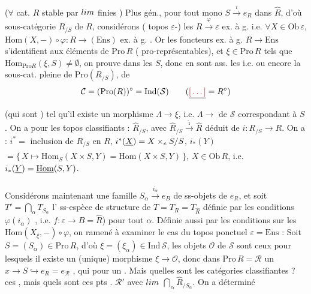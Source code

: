 \documentclass[11pt,a4paper]{article}
\begin{document}
($\forall$ cat. $R$ stable par $\varprojlim$ finies ) Plus
gén., pour tout mono $S \xrightarrow{\ i\ } e_{R}$ dans $\hat{R}$, d'où
sous-catégorie $R_{/S}$ de $R$,  considérons
( topos $\varepsilon$-\ill{}) les $R \xrightarrow{\ \varphi\ }
\varepsilon$ ex. à g.  
i.e. $\forall X \in \mathrm{Ob}\,\varepsilon$, $\mathrm{Hom}(X, -) \circ
\varphi : R \to (\mathrm{Ens})$ ex. à g. . Or les foncteurs ex. à g. \struck{\ill{}} $R \to
\mathrm{Ens}$ s'identifient \ill{} aux éléments de $\mathrm{Pro}\,R$
(\ill{} pro-représentables), et \struck{\ill{}} $\xi \in \mathrm{Pro}\,R$
tels que $\mathrm{Hom}_{\mathrm{Pro}R}(\xi, S) \neq \emptyset$, on prouve dans
les \ill{} $S$, donc en sont ass. les \ill{} i.e. \ill{} ou encore la
sous-cat. pleine de $\mathrm{Pro}(R_{/S})$,  de
\[
  \mathcal{C} = (\mathrm{Pro}(R))^{\circ} = \mathrm{Ind}(\mathcal{S})
  \qquad (\struck{\ill{}} = R^{\circ})
\]
(qui sont \struck{\ill{}} \ill{}) tel qu'il existe un morphisme $\Lambda \to
\xi$, i.e. $\Lambda \to$ \ill{} de $\mathcal{S}$ correspondant à $S$. On a
pour les topos \struck{\ill{}} classifiants \ill{} : $\hat{R}_{/S}$, avec
$\hat{R}_{/S} \xrightarrow{\ \hat{\imath}\ } \hat{R}$ déduit de $i :
R_{/S} \to R$. On a : $i^{*} =$ inclusion de $R_{/S}$ en $R$,
$i^{*}(\struck{X}) = X \times_{e} S / S$, $i_{*}(Y)$  $= \{\,X \mapsto \mathrm{Hom}_{S}(X \times S, Y) =
\mathrm{Hom}(X \times S, Y)\,\}$, $X \in \mathrm{Ob}\,R$, i.e.
$i_{*}(\struck{Y}) = \underline{\mathrm{Hom}}(S, Y)$.

Considérons maintenant une famille $S_{\alpha} \xrightarrow{\ i_{\alpha}\ }
e_{B}$  de ss-objets de $e_{R}$, et soit $T' =
\bigcap_{\alpha} T_{S_{\alpha}}$ l'\ill{} ss-espèce de structure de $T =
T_{R} = T_{\hat{R}}$ définie par les conditions $\varphi(i_{\alpha})$
, i.e. $f : \varepsilon \to B = \hat{R}$)
 pour tout $\alpha$. Définie aussi par les conditions sur les
$\mathrm{Hom}(X_{\xi}, -) \circ \varphi$, on  ramené à examiner le
cas du topos ponctuel $\varepsilon = \mathrm{Ens}$ :  Soit $S = (S_{\alpha}) \in \mathrm{Pro}\,R$,  d'où $\xi = (\xi_{\alpha}) \in
\mathrm{Ind}\,\mathcal{S}$, les objets \ill{} $\mathcal{O}$ de $\mathcal{S}$
\ill{} sont ceux pour lesquels il existe un (unique) morphisme $\xi \to
\mathcal{O}$, donc dans $\mathrm{Pro}\,R = \mathcal{R}$ un 
$x \to S \hookrightarrow e_{R} = e_{\mathcal{R}}$ \ill{} \ill{}, qui \ill{}
\ill{} pour un \ill{}. Mais quelles sont les catégories classifiantes ?
  \ill{}
ces \ill{}, mais quels sont ces pts \ill{}. \ill{} $\mathcal{R}'$  avec $\varprojlim$ \ill{} \ill{} $\bigcap_{\alpha}
\hat{R}_{/S_{\alpha}}$. On a déterminé
\end{document}
